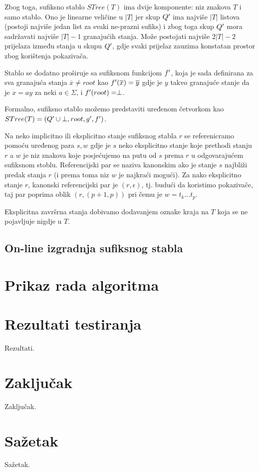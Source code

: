 \documentclass[times, utf8, seminar, numeric]{fer}
\begin{document}
	Zbog toga, sufiksno stablo $STree(T)$ ima dvije komponente: niz znakova $T$ i samo stablo. Ono je linearne veličine u $|T|$ jer skup $Q\rq{}$ ima najviše $|T|$ listova (postoji najviše jedan list za svaki ne-prazni sufiks) i zbog toga skup $Q\rq{}$ mora sadržavati najviše $|T| - 1$ granajućih stanja. Može postojati najviše $2|T| - 2$ prijelaza između stanja u skupu $Q\rq{}$, gdje svaki prijelaz zauzima konstatan prostor zbog korištenja pokazivača.
	
	Stablo se dodatno proširuje sa sufiksnom funkcijom $f\rq{}$, koja je sada definirana za sva granajuća stanja $\overline{x} \ne root$ kao $f\rq{}(\overline{x}) = \overline{y}$ gdje je $y$ takvo granajuće stanje da je $x = ay$ za neki $a \in \Sigma$, i $f\rq{}(root) = \perp$. 
	
	Formalno, sufiksno stablo možemo predstaviti uređenom četvorkom kao $STree(T) = (Q\rq{} \cup {\perp}, root, g\rq{}, f\rq{})$.
	
	Na neko implicitno ili eksplicitno stanje sufiksnog stabla $r$ se referenicramo pomoću uređenog para $s, w$ gdje je $s$ neko eksplicitno stanje koje prethodi stanju $r$ a $w$ je niz znakova koje posjećujemo na putu od $s$ prema $r$ u odgovarajućem sufiksnom stoblu. Referencijski par  se naziva kanonskim  ako je stanje $s$ najbliži predak stanja $r$ (i prema toma niz $w$ je najkraći mogući). Za nako eksplicitno stanje $r$, kanonski referencijski par je $(r, \epsilon)$, tj. budući da koristimo pokazivače, taj par poprima oblik $(r, (p+1, p))$ pri čemu je $w = t_k ... t_p$.
	
	Eksplicitna završrna stanja dobivamo dodavanjem oznake kraja na $T$ koja se ne pojavljuje nigdje u $T$.

\section{On-line izgradnja sufiksnog stabla}

\chapter{Prikaz rada algoritma}


\chapter{Rezultati testiranja}
Rezultati.

\chapter{Zaključak}
Zaključak.




\chapter{Sažetak}
Sažetak.
\end{document}
